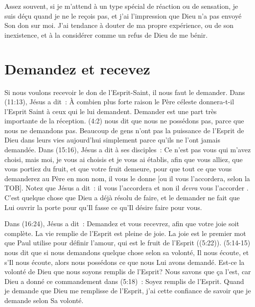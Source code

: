 Assez souvent, si je m'attend à un type spécial de réaction ou de sensation,
 je suis déçu quand je ne le reçois pas, et j'ai l'impression que Dieu
 n'a pas envoyé Son don sur moi. J'ai tendance à douter de ma propre
 expérience, 
 ou de son inexistence, et à la considérer
 comme un refus de Dieu de me bénir.


\section{Demandez et recevez}

Si nous voulons recevoir le don de l'Esprit-Saint,
 il nous faut le demander. Dans (11:13), Jésus a dit~:
 \og À combien plus forte raison le Père céleste donnera-t-il
 l'Esprit Saint à ceux qui le lui demandent. \fg{}
 Demander est une part très importante de la réception.
 (4:2) nous dit que nous ne possédons pas,
 parce que nous ne demandons pas. Beaucoup de gens n'ont pas
 la puissance de l'Esprit de Dieu dans leurs vies aujourd'hui
 simplement parce qu'ils ne l'ont jamais demandée.
 Dans (15:16), Jésus a dit à ses disciples~:
 \og Ce n'est pas vous qui m'avez choisi, mais moi,
 je vous ai choisis et je vous ai établis, afin que vous alliez,
 que vous portiez du fruit, et que votre fruit demeure,
 pour que tout ce que vous demanderez au Père en mon nom,
 il vous le donne [ou il vous l'accordera, selon la TOB]. \fg{}
 Notez que Jésus a dit~: \og il vous l'accordera \fg{} et non
 \og il \emph{devra} vous l'accorder \fg{}.
 C'est quelque chose que Dieu a déjà résolu de faire,
 et le demander ne fait que Lui ouvrir la porte pour qu'Il fasse
 ce qu'Il désire faire pour vous.

Dans (16:24), Jésus a dit~:
 \og Demandez et vous recevrez, afin que votre joie soit complète. \fg{}
 La vie remplie de l'Esprit est pleine de joie.
 La joie est le premier mot que Paul utilise pour définir l'amour,
 qui est le fruit de l'Esprit ((5:22)).
 (5:14-15) nous dit que si nous demandons quelque chose
 selon sa volonté, Il nous écoute, et s'Il nous écoute,
 alors nous possédons ce que nous Lui avons demandé.
 Est-ce la volonté de Dieu que nous soyons remplis de l'Esprit?
 Nous savons que ça l'est, car Dieu a donné ce commandement dans
 (5:18)~: \og Soyez remplis de l'Esprit. \fg{}
 Quand je demande que Dieu me remplisse de l'Esprit,
 j'ai cette confiance de savoir que je demande selon Sa volonté.

